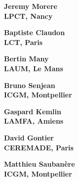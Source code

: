 \documentclass[20pt]{beamer}
\begin{document}
\begin{frame}
	\begin{center}
		\huge \bf Jeremy Morere
		\\
		\vspace{20mm}
		\large LPCT, Nancy
	\end{center}
\end{frame}

\begin{frame}
	\begin{center}
		\huge \bf Baptiste Claudon
		\\
		\vspace{20mm}
		\large LCT, Paris
	\end{center}
\end{frame}

\begin{frame}
	\begin{center}
		\huge \bf Bertin Many
		\\
		\vspace{20mm}
		\large LAUM, Le Mans
	\end{center}
\end{frame}

\begin{frame}
	\begin{center}
		\huge \bf Bruno Senjean
		\\
		\vspace{20mm}
		\large ICGM, Montpellier
	\end{center}
\end{frame}

\begin{frame}
	\begin{center}
		\huge \bf Gaspard Kemlin
		\\
		\vspace{20mm}
		\large LAMFA, Amiens
	\end{center}
\end{frame}

\begin{frame}
	\begin{center}
		\huge \bf David Gontier
		\\
		\vspace{20mm}
		\large  CEREMADE, Paris
	\end{center}
\end{frame}

\begin{frame}
	\begin{center}
		\huge \bf Matthieu Saubanère
		\\
		\vspace{20mm}
		\large ICGM, Montpellier
	\end{center}
\end{frame}
\end{document}
